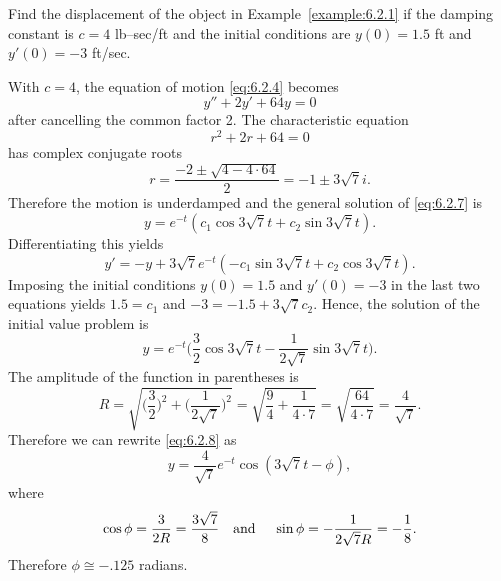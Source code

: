 \setcounter{example}{1}
\begin{example}
  \label{example:6.2.2}\rm Find the displacement of the object in Example~\ref{example:6.2.1} if the
  damping constant is $c=4$ lb--sec/ft and the initial conditions are $y(0)=1.5$ ft and $y'(0)=-3$
  ft/sec.
\end{example}
\setcounter{equation}{6}
\begin{examplesolution}
\solution With $c=4$, the equation of motion \eqref{eq:6.2.4} becomes
\begin{equation}
  \label{eq:6.2.7}y''+2y'+64y=0
\end{equation}
after cancelling the common factor 2. The characteristic equation
\[
  r^{2}+2r+64=0
\]
has complex conjugate roots
\[
  r=\frac{-2\pm\sqrt{4-4\cdot64}}{2}=-1\pm3\sqrt{7}i.
\]
Therefore the motion is underdamped and the general solution of \eqref{eq:6.2.7} is
\[
  y=e^{-t}(c_{1}\cos3\sqrt{7}t+c_{2}\sin3\sqrt{7}t).
\]
Differentiating this yields
\[
  y'=-y+3\sqrt{7}e^{-t}(-c_{1}\sin3\sqrt{7}t+c_{2}\cos3\sqrt{7}t).
\]
Imposing the initial conditions $y(0)=1.5$ and $y'(0)=-3$ in the last two equations yields
$1.5=c_{1}$ and $-3=-1.5+3\sqrt{7}c_{2}$. Hence, the solution of the initial value problem is
\begin{equation}
  \label{eq:6.2.8}y=e^{-t}\bigg(\frac{3}{2}\cos3\sqrt{7}t-\frac{1}{2\sqrt{7}}\sin3\sqrt{7}t\bigg).
\end{equation}
The amplitude of the function in parentheses is
\[
  R=\sqrt{\bigg(\frac{3}{2}\bigg)^{2}+\bigg(\frac{1}{2\sqrt{7}}\bigg)^{2}}=\sqrt{\frac{9}{4}+\frac{1}{4\cdot7}}=\sqrt{\frac{64}{4\cdot7}}=\frac{4}{\sqrt{7}}.
\]
Therefore we can rewrite \eqref{eq:6.2.8} as
\[
  y=\frac{4}{\sqrt{7}}e^{-t}\cos(3\sqrt{7}t-\phi),
\]
where
\[
  \cos\phi=\frac{3}{2R}=\frac{3\sqrt{7}}{8}\mbox{\quad and \quad}\sin\phi=-\frac{1}{2\sqrt{7}R}= -\frac{1}{8}.
\]
Therefore $\phi\cong-.125$ radians.
\end{examplesolution}

